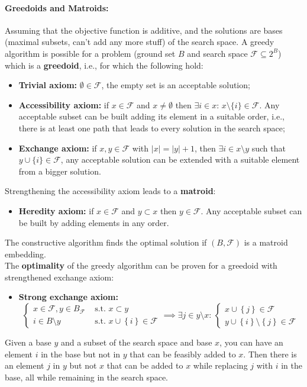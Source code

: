 \documentclass{article}
\begin{document}
	\paragraph{Greedoids and Matroids:} Assuming that the objective function is additive, and the solutions are bases (maximal subsets, can't add any more stuff) of the search space. A greedy algorithm is possible for a problem (ground set $B$ and search space $\mathcal{F} \subseteq 2^B$) which is a \textbf{greedoid}, i.e., for which the following hold: 
	\begin{itemize}
		\item \textbf{Trivial axiom:} $\emptyset \in \mathcal{F}$, the empty set is an acceptable solution;
		\item \textbf{Accessibility axiom:} if $x \in \mathcal{F}$ and $x \neq \emptyset$ then $\exists i \in x : \, x \setminus \{i\} \in \mathcal{F}$. Any acceptable subset can be built adding its element in a suitable order, i.e., there is at least one path that leads to every solution in the search space;
		\item \textbf{Exchange axiom:}  if $x, y \in \mathcal{F}$ with $|x| = |y| + 1$, then $\exists i \in x \setminus y$ such that $y \cup \{i\} \in \mathcal{F}$, any acceptable solution can be extended with a suitable element from a bigger solution.
	\end{itemize}
	Strengthening the accessibility axiom leads to a \textbf{matroid}: 
	\begin{itemize}
		\item \textbf{Heredity axiom:} if $x \in \mathcal{F}$ and $y \subset x$ then $y \in \mathcal{F}$. Any acceptable subset can be built by adding elements in any order.\\
	\end{itemize}
	The constructive algorithm finds the optimal solution if $(B, \mathcal{F})$ is a matroid embedding.\\
	
	The \textbf{optimality} of the greedy algorithm can be proven for a greedoid with strengthened exchange axiom: 
	\begin{itemize}
		\item \textbf{Strong exchange axiom:}
		$$ 
		\begin{cases}
			x \in \mathcal{F}, y \in B_{\mathcal{F}} & \text{ s.t. } x \subset y \\
			i \in B \setminus y & \text{ s.t. } x \cup \left\{i\right\} \in \mathcal{F}
		\end{cases}
		\implies \exists j \in y \setminus x: \, 
		\begin{cases}
			x \cup \left\{j\right\} \in \mathcal{F} \\
			y \cup \left\{i\right\} \setminus \left\{j\right\} \in \mathcal{F}
		\end{cases}
		$$
	\end{itemize}
	Given a base $y$ and a subset of the search space and base $x$, you can have an element $i$ in the base but not in $y$ that can be feasibly added to $x$. Then there is an element $j$ in $y$ but not $x$ that can be added to $x$ while replacing $j$ with $i$ in the base, all while remaining in the search space.\\
	
\end{document}
